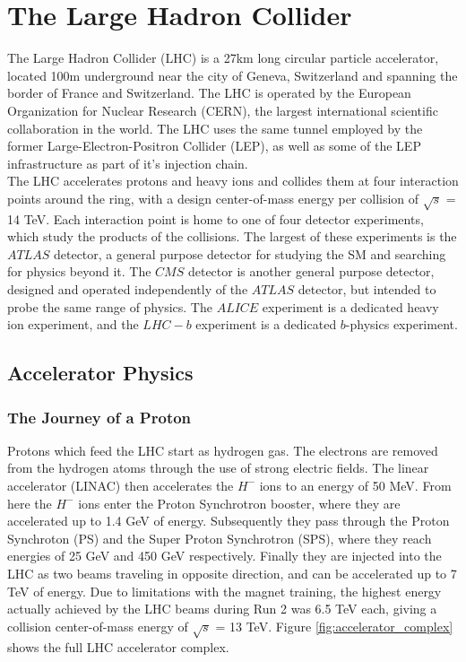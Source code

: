 \chapter{The Large Hadron Collider}
The Large Hadron Collider (LHC) is a 27km long circular particle accelerator, located 100m underground near the city of Geneva, Switzerland and spanning the border of France and Switzerland. The LHC is operated by the  European Organization for Nuclear Research (CERN), the largest international scientific collaboration in the world. The LHC uses the same tunnel employed by the former Large-Electron-Positron Collider (LEP), as well as some of the LEP infrastructure as part of it's injection chain.\\

The LHC accelerates protons and heavy ions and collides them at four interaction points around the ring, with a design center-of-mass energy per collision of $\sqrt{s}$ = 14 TeV. Each interaction point is home to one of four detector experiments, which study the products of the collisions. The largest of these experiments is the $ATLAS$ detector, a general purpose detector for studying the SM and searching for physics beyond it. The $CMS$ detector is another general purpose detector, designed and operated independently of the $ATLAS$ detector, but intended to probe the same range of physics. The $ALICE$ experiment is a dedicated heavy ion experiment, and the $LHC-b$ experiment is a dedicated $b$-physics experiment.\\

 \section{Accelerator Physics}
 \subsection{The Journey of a Proton}
 Protons which feed the LHC start as hydrogen gas. The electrons are removed from the hydrogen atoms through the use of strong electric fields. The linear accelerator (LINAC) then accelerates the $H^-$ ions to an energy of 50 MeV. From here the $H^-$ ions enter the Proton Synchrotron booster, where they are accelerated up to 1.4 GeV of energy. Subsequently they pass through the Proton Synchroton (PS) and the Super Proton Synchrotron (SPS), where they reach energies of 25 GeV and 450 GeV respectively. Finally they are injected into the LHC as two beams traveling in opposite direction, and can be accelerated up to 7 TeV of energy. Due to limitations with the magnet training, the highest energy actually achieved by the LHC beams during Run 2 was 6.5 TeV each, giving a collision center-of-mass energy of $\sqrt{s}$ = 13 TeV. Figure \ref{fig:accelerator_complex} shows the full LHC accelerator complex.\\

